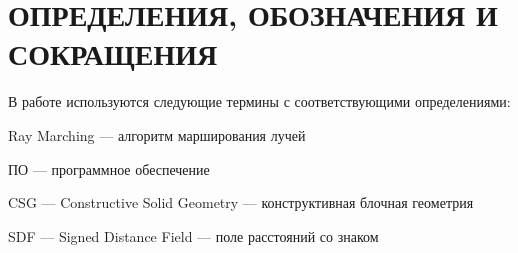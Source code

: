 \section*{ОПРЕДЕЛЕНИЯ, ОБОЗНАЧЕНИЯ И СОКРАЩЕНИЯ}
В работе используются следующие термины с соответствующими определениями:

Ray Marching --- алгоритм марширования лучей

ПО --- программное обеспечение

CSG --- Constructive Solid Geometry --- конструктивная блочная геометрия

SDF –-- Signed Distance Field --- поле расстояний со знаком
\pagebreak